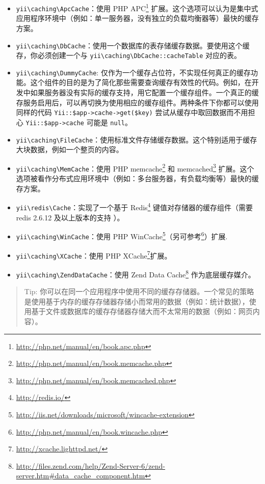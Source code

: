 \begin{itemize}
\item \texttt{yii{\allowbreak{}\textbackslash}caching{\allowbreak{}\textbackslash}ApcCache}：使用 PHP APC\footnote{\url{http://php.net/manual/en/book.apc.php}} 扩展。这个选项可以认为是集中式应用程序环境中（例如：单一服务器，没有独立的负载均衡器等）最快的缓存方案。
\item \texttt{yii{\allowbreak{}\textbackslash}caching{\allowbreak{}\textbackslash}DbCache}：使用一个数据库的表存储缓存数据。要使用这个缓存，你必须创建一个与 \texttt{yii{\allowbreak{}\textbackslash}caching{\allowbreak{}\textbackslash}DbCache\allowbreak{}::\allowbreak{}cacheTable} 对应的表。
\item \texttt{yii{\allowbreak{}\textbackslash}caching{\allowbreak{}\textbackslash}DummyCache}: 仅作为一个缓存占位符，不实现任何真正的缓存功能。这个组件的目的是为了简化那些需要查询缓存有效性的代码。例如，在开发中如果服务器没有实际的缓存支持，用它配置一个缓存组件。一个真正的缓存服务启用后，可以再切换为使用相应的缓存组件。两种条件下你都可以使用同样的代码 \lstinline|Yii::$app->cache->get($key)| 尝试从缓存中取回数据而不用担心 \lstinline|Yii::$app->cache| 可能是 \lstinline|null|。
\item \texttt{yii{\allowbreak{}\textbackslash}caching{\allowbreak{}\textbackslash}FileCache}：使用标准文件存储缓存数据。这个特别适用于缓存大块数据，例如一个整页的内容。
\item \texttt{yii{\allowbreak{}\textbackslash}caching{\allowbreak{}\textbackslash}MemCache}：使用 PHP memcache\footnote{\url{http://php.net/manual/en/book.memcache.php}} 和 memcached\footnote{\url{http://php.net/manual/en/book.memcached.php}} 扩展。这个选项被看作分布式应用环境中（例如：多台服务器，有负载均衡等）最快的缓存方案。
\item \texttt{yii{\allowbreak{}\textbackslash}redis{\allowbreak{}\textbackslash}Cache}：实现了一个基于 Redis\footnote{\url{http://redis.io/}} 键值对存储器的缓存组件（需要 redis 2.6.12 及以上版本的支持 ）。
\item \texttt{yii{\allowbreak{}\textbackslash}caching{\allowbreak{}\textbackslash}WinCache}：使用 PHP WinCache\footnote{\url{http://iis.net/downloads/microsoft/wincache-extension}}（另可参考\footnote{\url{http://php.net/manual/en/book.wincache.php}}）扩展.
\item \texttt{yii{\allowbreak{}\textbackslash}caching{\allowbreak{}\textbackslash}XCache}：使用 PHP XCache\footnote{\url{http://xcache.lighttpd.net/}}扩展。
\item \texttt{yii{\allowbreak{}\textbackslash}caching{\allowbreak{}\textbackslash}ZendDataCache}：使用 Zend Data Cache\footnote{\url{http://files.zend.com/help/Zend-Server-6/zend-server.htm\#data\_cache\_component.htm}} 作为底层缓存媒介。
\end{itemize}
\begin{quote}Tip: 你可以在同一个应用程序中使用不同的缓存存储器。一个常见的策略是使用基于内存的缓存存储器存储小而常用的数据（例如：统计数据），使用基于文件或数据库的缓存存储器存储大而不太常用的数据（例如：网页内容）。

\end{quote}
